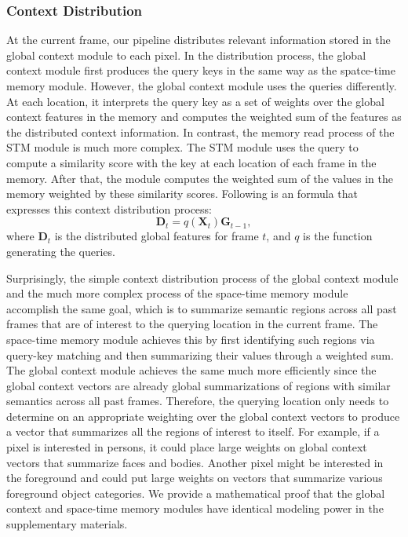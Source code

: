 \documentclass[runningheads]{llncs}
\begin{document}
\subsubsection{Context Distribution}
At the current frame, our pipeline distributes relevant information stored in the global context module to each pixel. In the distribution process, the global context module first produces the query keys in the same way as the spatce-time memory module. However, the global context module uses the queries differently. At each location, it interprets the query key as a set of weights over the global context features in the memory and computes the weighted sum of the features as the distributed context information. In contrast, the memory read process of the STM module is much more complex. The STM module uses the query to compute a similarity score with the key at each location of each frame in the memory. After that, the module computes the weighted sum of the values in the memory weighted by these similarity scores. Following is an formula that expresses this context distribution process:
\begin{equation}
\label{eq:eq3}
    \bm{D}_t = q(\bm{X}_t)\bm{G}_{t - 1},
\end{equation}
where $\bm{D}_t$ is the distributed global features for frame $t$, and $q$ is the function generating the queries.

Surprisingly, the simple context distribution process of the global context module and the much more complex process of the space-time memory module accomplish the same goal, which is to summarize semantic regions across all past frames that are of interest to the querying location in the current frame. The space-time memory module achieves this by first identifying such regions via query-key matching and then summarizing their values through a weighted sum. The global context module achieves the same much more efficiently since the global context vectors are already global summarizations of regions with similar semantics across all past frames. Therefore, the querying location only needs to determine on an appropriate weighting over the global context vectors to produce a vector that summarizes all the regions of interest to itself. For example, if a pixel is interested in persons, it could place large weights on global context vectors that summarize faces and bodies. Another pixel might be interested in the foreground and could put large weights on vectors that summarize various foreground object categories. We provide a mathematical proof that the global context and space-time memory modules have identical modeling power in the supplementary materials.
\end{document}
